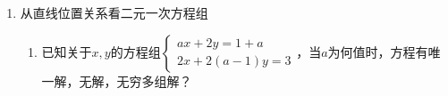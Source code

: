\begin{enumerate}
\begin{enumerate}
\begin{enumerate}
            \item 若等腰三角形$ABC$的一边长$a = 4$，另两边的长$b, c$恰是这个方程的两根，求三角形$ABC$的周长.
        \end{enumerate}
        \begin{jieda}
            \begin{enumerate}
                \item $\Delta = (2k+1)^2 - 16(k-\dfrac{1}{2}) = 4k^2 + 4k + 1 - 16k + 8 = 4k^2 - 12k + 9$，$\Delta_k = 0$，故$\Delta \geq 0$恒成立，因此无论$k$取何值，此方程总有实数根.
                \item {} $b = a = 4$，根据韦达定理有$c = k-\dfrac{1}{2}$，根据韦达定理进一步有$4+k-\dfrac{1}{2} = 2k+1$，解得$k = \dfrac{5}{2}$，故$c = 2$，满足三角形要求，此时周长为10. \\
                 $c = a = 4$和上一种情况对称，此时周长为10. \\
                 $b = c$，此时有$\Delta = 0$，即$k = \dfrac{3}{2}$，故$b = c = 2$，此时不满足三角形要求. \\
                综上，周长为10
            \end{enumerate}
        \end{jieda}
    \end{enumerate}
    \item 从直线位置关系看二元一次方程组
    \begin{enumerate}
        \item 已知关于$x, y$的方程组$\left \{ \begin{array}{l}
         ax+2y = 1+a  \\
         2x+2(a-1)y = 3 
        \end{array} \right .$，当$a$为何值时，方程有唯一解，无解，无穷多组解？
        \begin{jieda}
\end{jieda}
\end{enumerate}
\end{enumerate}

